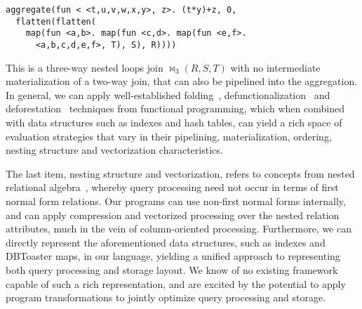 \begin{verbatim}
aggregate(fun < <t,u,v,w,x,y>, z>. (t*y)+z, 0,
  flatten(flatten(
    map(fun <a,b>. map(fun <c,d>. map(fun <e,f>.
      <a,b,c,d,e,f>, T), S), R))))
\end{verbatim}

This is a three-way nested loops join $\bowtie_3(R,S,T)$ with no intermediate
materialization of a two-way join, that can also be pipelined into the
aggregation. In general, we can apply well-established
folding~\cite{bacon-acms:94}, defunctionalization~\cite{danvy-ppdp:01} and
deforestation~\cite{marlow-fp:92} techniques from functional programming, which
when combined with data structures such as indexes and hash tables,
can yield a rich space of evaluation strategies that vary in their pipelining,
materialization, ordering, nesting structure and vectorization characteristics.

The last item, nesting structure and vectorization, refers to concepts from
nested relational algebra~\cite{schek-infsys:86}, whereby query processing need
not occur in terms of first normal form relations. Our programs can use
non-first normal forms internally, and can apply compression and vectorized
processing over the nested relation attributes, much in the vein of
column-oriented processing. Furthermore, we can directly represent the
aforementioned data structures, such as indexes and DBToaster maps, in our
language, yielding a unified approach to representing both query processing and
storage layout. We know of no existing framework capable of such a rich
representation, and are excited by the potential to apply program
transformations to jointly optimize query processing and storage.


